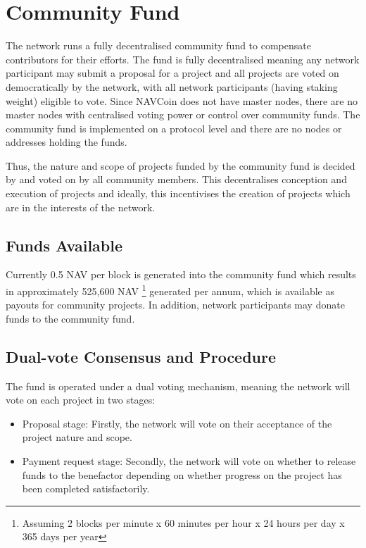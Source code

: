 \section{Community Fund}
\label{S:9}

The network runs a fully decentralised community fund to compensate contributors for their efforts. The 
fund is fully decentralised meaning any network participant may submit a proposal for a project and all 
projects are voted on democratically by the network, with all network participants (having staking weight) 
eligible to vote. Since NAVCoin does not have master nodes, there are no master nodes with centralised 
voting power or control over community funds. The community fund is implemented on a protocol level and 
there are no nodes or addresses holding the funds.

Thus, the nature and scope of projects funded by the community fund is decided by and voted on by all community 
members. This decentralises conception and execution of projects and ideally, this incentivises the creation 
of projects which are in the interests of the network. 

\subsection{Funds Available}

Currently 0.5 NAV per block is generated into the community fund which results in approximately 525,600 NAV
\footnote{Assuming 2 blocks per minute x 60 minutes per hour x 24 hours per day x 365 days per year} 
generated per annum, which is available as payouts for community projects. In addition, network participants 
may donate funds to the community fund.

\subsection{Dual-vote Consensus and Procedure}

The fund is operated under a dual voting mechanism, meaning the network will vote on each project in two
stages:
\begin{itemize}
\item Proposal stage: Firstly, the network will vote on their acceptance of the project nature and scope.
\item Payment request stage: Secondly, the network will vote on whether to release funds to the benefactor 
depending on whether progress on the project has been completed satisfactorily.
\end{itemize}

